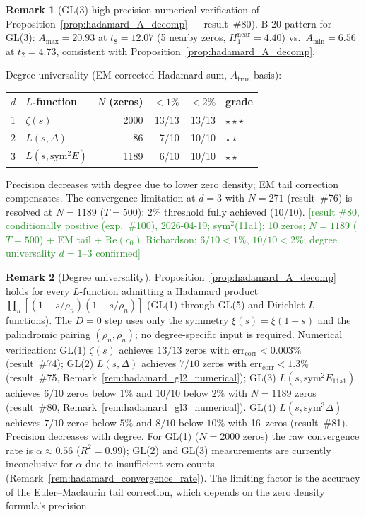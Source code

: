 \documentclass[11pt, a4paper]{article}
\theoremstyle{definition}
\newtheorem{remark}{Remark}[section]
\theoremstyle{plain}
\begin{document}
\begin{remark}[GL(3) high-precision numerical verification of Proposition~\ref{prop:hadamard_A_decomp} --- result~\#80]
B-20 pattern for GL(3): $A_{\max} = 20.93$ at $t_8=12.07$
(5 nearby zeros, $H_1^{\text{near}} = 4.40$) vs.\ $A_{\min} = 6.56$ at $t_2=4.73$,
consistent with Proposition~\ref{prop:hadamard_A_decomp}.

Degree universality (EM-corrected Hadamard sum, $A_{\text{true}}$ basis):
\smallskip
\begin{center}
\small
\begin{tabular}{@{}llrrrl@{}}
\toprule
$d$ & $L$-function & $N$ (zeros) & ${<}1\%$ & ${<}2\%$ & grade \\
\midrule
1 & $\zeta(s)$ & 2000 & 13/13 & 13/13 & $\star\star\star$ \\
2 & $L(s,\Delta)$ & 86 & 7/10 & 10/10 & $\star\star$ \\
3 & $L(s,\mathrm{sym}^2 E)$ & 1189 & 6/10 & 10/10 & $\star\star$ \\
\bottomrule
\end{tabular}
\end{center}
\smallskip\noindent
Precision decreases with degree due to lower zero density; EM tail correction
compensates. The convergence limitation at $d=3$ with $N=271$ (result~\#76)
is resolved at $N=1189$ ($T=500$): $2\%$ threshold fully achieved (10/10).
\textcolor{ForestGreen}{[result \#80, conditionally positive (exp.\ \#100), 2026-04-19;
sym$^2$(11a1); 10 zeros; $N{=}1189$ ($T{=}500$) + EM tail + Re$(c_0)$ Richardson;
$6/10{<}1\%$, $10/10{<}2\%$; degree universality $d{=}1$--$3$ confirmed]}
\end{remark}

\begin{remark}[Degree universality]
\label{rem:hadamard_degree_univ}
Proposition~\ref{prop:hadamard_A_decomp} holds for every $L$-function admitting
a Hadamard product $\prod_n[(1-s/\rho_n)(1-s/\bar\rho_n)]$
(GL(1) through GL(5) and Dirichlet $L$-functions).
The $D=0$ step uses only the symmetry $\xi(s)=\xi(1-s)$ and the palindromic
pairing $(\rho_n,\bar\rho_n)$; no degree-specific input is required.
Numerical verification: GL(1) $\zeta(s)$ achieves $13/13$ zeros with
$\mathrm{err}_{\mathrm{corr}} < 0.003\%$ (result~\#74); GL(2) $L(s,\Delta)$
achieves $7/10$ zeros with $\mathrm{err}_{\mathrm{corr}} < 1.3\%$
(result~\#75, Remark~\ref{rem:hadamard_gl2_numerical});
GL(3) $L(s,\mathrm{sym}^2 E_{11\mathrm{a}1})$ achieves $6/10$ zeros below $1\%$
and $10/10$ below $2\%$ with $N{=}1189$ zeros
(result~\#80, Remark~\ref{rem:hadamard_gl3_numerical}).
GL(4) $L(s,\mathrm{sym}^3\Delta)$ achieves $7/10$ zeros below $5\%$
and $8/10$ below $10\%$ with 16~zeros (result~\#81).
Precision decreases with degree.  For GL(1) ($N{=}2000$ zeros) the raw
convergence rate is $\alpha \approx 0.56$ ($R^2{=}0.99$); GL(2) and GL(3)
measurements are currently inconclusive for $\alpha$ due to insufficient zero counts
(Remark~\ref{rem:hadamard_convergence_rate}).
The limiting factor is the accuracy of the Euler--Maclaurin tail
correction, which depends on the zero density formula's precision.
\end{remark}
\end{document}
